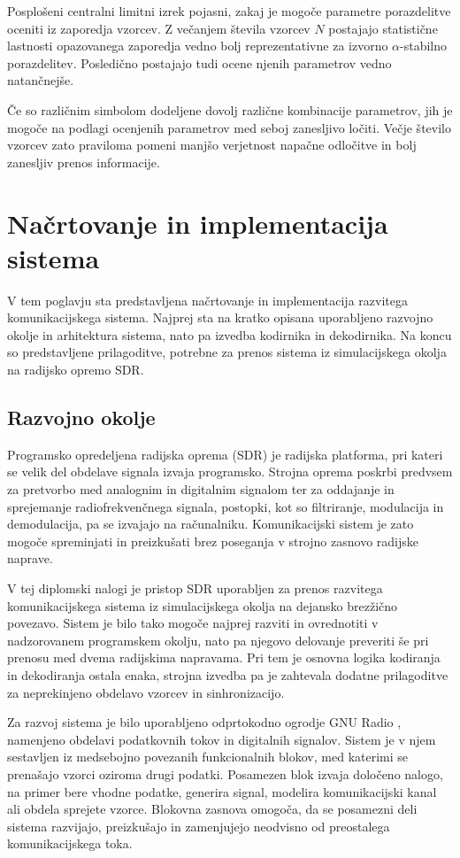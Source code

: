 \documentclass[a4paper, 12pt, openany]{book}
\begin{document}
Posplošeni centralni limitni izrek pojasni, zakaj je mogoče parametre porazdelitve oceniti iz zaporedja vzorcev. Z večanjem števila vzorcev $N$ postajajo statistične lastnosti opazovanega zaporedja vedno bolj reprezentativne za izvorno $\alpha$-stabilno porazdelitev. Posledično postajajo tudi ocene njenih parametrov vedno natančnejše.

Če so različnim simbolom dodeljene dovolj različne kombinacije parametrov, jih je mogoče na podlagi ocenjenih parametrov med seboj zanesljivo ločiti. Večje število vzorcev zato praviloma pomeni manjšo verjetnost napačne odločitve in bolj zanesljiv prenos informacije.

\chapter{Načrtovanje in implementacija sistema}

V tem poglavju sta predstavljena načrtovanje in implementacija razvitega komunikacijskega sistema. Najprej sta na kratko opisana uporabljeno razvojno okolje in arhitektura sistema, nato pa izvedba kodirnika in dekodirnika. Na koncu so predstavljene prilagoditve, potrebne za prenos sistema iz simulacijskega okolja na radijsko opremo SDR.

\section{Razvojno okolje}

Programsko opredeljena radijska oprema (SDR) je radijska platforma, pri kateri se velik del obdelave signala izvaja programsko. Strojna oprema poskrbi predvsem za pretvorbo med analognim in digitalnim signalom ter za oddajanje in sprejemanje radiofrekvenčnega signala, postopki, kot so filtriranje, modulacija in demodulacija, pa se izvajajo na računalniku. Komunikacijski sistem je zato mogoče spreminjati in preizkušati brez poseganja v strojno zasnovo radijske naprave.

V tej diplomski nalogi je pristop SDR uporabljen za prenos razvitega komunikacijskega sistema iz simulacijskega okolja na dejansko brezžično povezavo. Sistem je bilo tako mogoče najprej razviti in ovrednotiti v nadzorovanem programskem okolju, nato pa njegovo delovanje preveriti še pri prenosu med dvema radijskima napravama. Pri tem je osnovna logika kodiranja in dekodiranja ostala enaka, strojna izvedba pa je zahtevala dodatne prilagoditve za neprekinjeno obdelavo vzorcev in sinhronizacijo.

Za razvoj sistema je bilo uporabljeno odprtokodno ogrodje GNU Radio \cite{gnuradioWebsite}, namenjeno obdelavi podatkovnih tokov in digitalnih signalov. Sistem je v njem sestavljen iz medsebojno povezanih funkcionalnih blokov, med katerimi se prenašajo vzorci oziroma drugi podatki. Posamezen blok izvaja določeno nalogo, na primer bere vhodne podatke, generira signal, modelira komunikacijski kanal ali obdela sprejete vzorce. Blokovna zasnova omogoča, da se posamezni deli sistema razvijajo, preizkušajo in zamenjujejo neodvisno od preostalega komunikacijskega toka.
\end{document}
